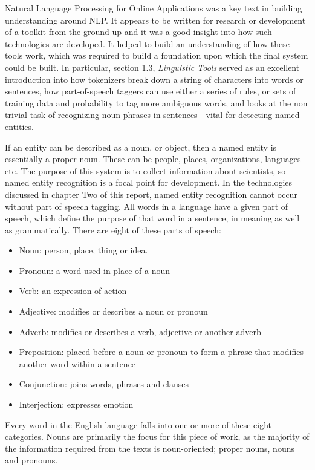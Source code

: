\documentclass[11pt,a4paper]{book}
\begin{document}
Natural Language Processing for Online Applications\cite{jackson_natural_2007}
was a key text in building understanding around NLP. It appears to be written for research or development of a toolkit from the ground up and it was a good insight into how such technologies are developed. It helped to build an understanding of how these tools work, which was required to build a foundation upon which the final system could be built. In particular, section 1.3, \textit{Linguistic Tools} served as an excellent introduction into how tokenizers break down a string of characters into words or sentences, how part-of-speech taggers can use either a series of rules, or sets of training data and probability to tag more ambiguous words, and looks at the non trivial task of recognizing noun phrases in sentences - vital for detecting named entities.

 If an entity can be described as a noun, or object, then a named entity is essentially a proper noun. These can be people, places, organizations, languages etc. The purpose of this system is to collect information about scientists, so named entity recognition is a focal point for development. In the technologies discussed in chapter Two of this report, named entity recognition cannot occur without part of speech tagging. All words in a language have a given part of speech, which define the purpose of that word in a sentence, in meaning as well as grammatically. There are eight of these parts of speech\cite{noauthor_eight_nodate}:
 \begin{itemize}
 	\item Noun: person, place, thing or idea. 
 	\item Pronoun: a word used in place of a noun
 	\item Verb: an expression of action
 	\item Adjective: modifies or describes a noun or pronoun
 	\item Adverb: modifies or describes a verb, adjective or another adverb
 	\item Preposition: placed before a noun or pronoun to form a phrase that modifies another word within a sentence
 	\item Conjunction: joins words, phrases and clauses
 	\item Interjection: expresses emotion
 \end{itemize}
Every word in the English language falls into one or more of these eight categories. Nouns are primarily the focus for this piece of work, as the majority of the information required from the texts is noun-oriented; proper nouns, nouns and pronouns. 
\end{document}
